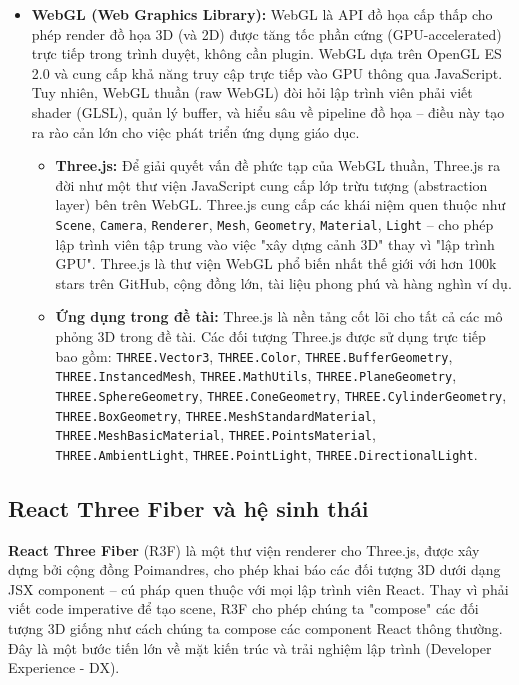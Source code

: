\begin{itemize}
    \item \textbf{WebGL (Web Graphics Library):} WebGL là API đồ họa cấp thấp cho phép render đồ họa 3D (và 2D) được tăng tốc phần cứng (GPU-accelerated) trực tiếp trong trình duyệt, không cần plugin. WebGL dựa trên OpenGL ES 2.0 và cung cấp khả năng truy cập trực tiếp vào GPU thông qua JavaScript. Tuy nhiên, WebGL thuần (raw WebGL) đòi hỏi lập trình viên phải viết shader (GLSL), quản lý buffer, và hiểu sâu về pipeline đồ họa – điều này tạo ra rào cản lớn cho việc phát triển ứng dụng giáo dục.
    \begin{itemize}
        \item \textbf{Three.js:} Để giải quyết vấn đề phức tạp của WebGL thuần, Three.js ra đời như một thư viện JavaScript cung cấp lớp trừu tượng (abstraction layer) bên trên WebGL. Three.js cung cấp các khái niệm quen thuộc như \texttt{Scene}, \texttt{Camera}, \texttt{Renderer}, \texttt{Mesh}, \texttt{Geometry}, \texttt{Material}, \texttt{Light} – cho phép lập trình viên tập trung vào việc "xây dựng cảnh 3D" thay vì "lập trình GPU". Three.js là thư viện WebGL phổ biến nhất thế giới với hơn 100k stars trên GitHub, cộng đồng lớn, tài liệu phong phú và hàng nghìn ví dụ.
        \item \textbf{Ứng dụng trong đề tài:} Three.js là nền tảng cốt lõi cho tất cả các mô phỏng 3D trong đề tài. Các đối tượng Three.js được sử dụng trực tiếp bao gồm: \texttt{THREE.Vector3}, \texttt{THREE.Color}, \texttt{THREE.BufferGeometry}, \texttt{THREE.InstancedMesh}, \texttt{THREE.MathUtils}, \texttt{THREE.PlaneGeometry}, \texttt{THREE.SphereGeometry}, \texttt{THREE.ConeGeometry}, \texttt{THREE.CylinderGeometry}, \texttt{THREE.BoxGeometry}, \texttt{THREE.MeshStandardMaterial}, \texttt{THREE.MeshBasicMaterial}, \texttt{THREE.PointsMaterial}, \texttt{THREE.AmbientLight}, \texttt{THREE.PointLight}, \texttt{THREE.DirectionalLight}.
    \end{itemize}
\end{itemize}

\subsection{React Three Fiber và hệ sinh thái}

\textbf{React Three Fiber} (R3F) là một thư viện renderer cho Three.js, được xây dựng bởi cộng đồng Poimandres, cho phép khai báo các đối tượng 3D dưới dạng JSX component – cú pháp quen thuộc với mọi lập trình viên React. Thay vì phải viết code imperative để tạo scene, R3F cho phép chúng ta "compose" các đối tượng 3D giống như cách chúng ta compose các component React thông thường. Đây là một bước tiến lớn về mặt kiến trúc và trải nghiệm lập trình (Developer Experience - DX).

